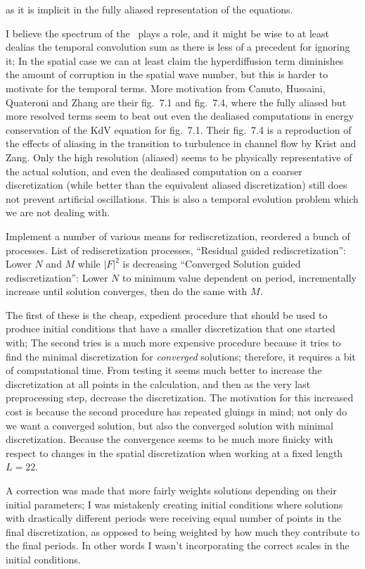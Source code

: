as it is implicit in the fully aliased representation of the equations.

I believe the spectrum of the \KSe\ plays a role, and it might be wise to at
least dealias the temporal convolution sum as there is less of a precedent
for ignoring it; In the spatial case we can at least claim the hyperdiffusion
term diminishes the amount of corruption in the spatial wave number, but this
is harder to motivate for the temporal terms.
More motivation from Canuto, Hussaini, Quateroni and Zhang are
their fig.~7.1 and fig.~7.4, where the fully aliased but more resolved terms seem
to beat out even the dealiased computations in energy conservation of the KdV
equation for fig.~7.1.
Their fig.~7.4 is a reproduction of the effects of aliasing in the transition
to turbulence in channel flow by  Krist and Zang. Only the high
resolution (aliased) seems to be physically representative of the actual
solution, and even the dealiased computation on a coarser discretization
(while better than the equivalent aliased discretization) still does not
prevent artificial oscillations. This is also a temporal evolution problem
which we are not dealing with.

Implement a number of various means for rediscretization,
reordered a bunch of processes.
List of rediscretization processes, ``Residual guided rediscretization'':
 Lower $N$ and $M$ while $|F|^2$ is decreasing
``Converged Solution guided rediscretization'': Lower $N$ to minimum
value dependent on period, incrementally increase until solution converges,
then do
the same with $M$.

The first of these is the cheap, expedient procedure that should
 be used to produce initial conditions that
have a smaller discretization that one started with; The second
tries is a much more expensive procedure
because it tries to find the minimal discretization for \emph{converged}
solutions; therefore, it requires
a bit of computational time. From testing it seems much better to
 increase the discretization at all points
in the calculation, and then as the very last preprocessing step,
 decrease the discretization.
The motivation for this increased cost is because the second
 procedure has repeated gluings in mind; not only
do we want a converged solution, but also the converged solution
with minimal discretization. Because the convergence
seems to be much more finicky with respect to changes in the
spatial discretization when working at a fixed
length $L=22$.

A correction was made that more fairly weights solutions
depending on their initial parameters; I was mistakenly
creating initial conditions where solutions with drastically
different periods were receiving equal number of points
in the final discretization, as opposed to being weighted by
how much they contribute to the final periods. In other
words I wasn't incorporating the correct scales in the
initial conditions.

